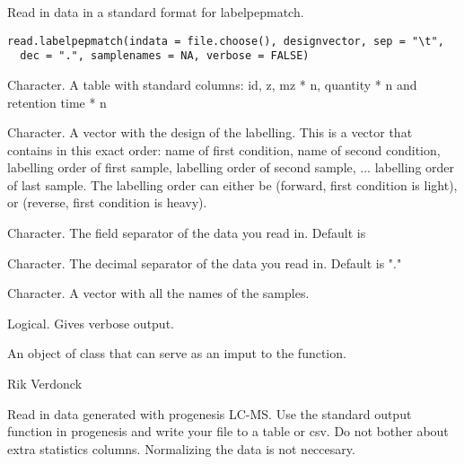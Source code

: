 \documentclass[letterpaper]{book}
\begin{document}
%
\begin{Description}\relax
Read in data in a standard format for labelpepmatch.
\end{Description}
%
\begin{Usage}
\begin{verbatim}
read.labelpepmatch(indata = file.choose(), designvector, sep = "\t",
  dec = ".", samplenames = NA, verbose = FALSE)
\end{verbatim}
\end{Usage}
%
\begin{Arguments}
\begin{ldescription}
\item[\code{indata}] Character. A table with standard columns: id, z, mz * n, quantity * n and retention time * n

\item[\code{designvector}] Character. A vector with the design of the labelling. This is a vector that contains in this exact order: name of first condition, name of second condition, labelling order of first sample, labelling order of second sample, ... labelling order of last sample. The labelling order can either be  (forward, first condition is light), or  (reverse, first condition is heavy).

\item[\code{sep}] Character. The field separator of the data you read in. Default is 

\item[\code{dec}] Character. The decimal separator of the data you read in. Default is "."

\item[\code{samplenames}] Character. A vector with all the names of the samples.

\item[\code{verbose}] Logical. Gives verbose output.
\end{ldescription}
\end{Arguments}
%
\begin{Value}
An object of class  that can serve as an imput to the  function.
\end{Value}
%
\begin{Author}\relax
Rik Verdonck
\end{Author}
%
\begin{Description}\relax
Read in data generated with progenesis LC-MS. Use the standard output function in progenesis and write your file to a table or csv. Do not bother about extra statistics columns. Normalizing the data is not neccesary.
\end{Description}
\end{document}
